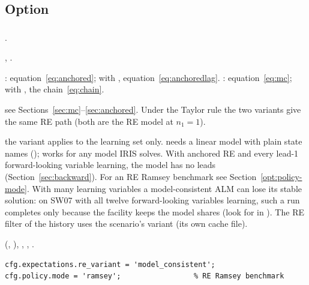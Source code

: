 \documentclass[11pt,a4paper]{article}
\DeclareRobustCommand{\codem}[1]{\texttt{\detokenize{#1}}}
\newenvironment{optspec}%
  {\begin{description}[style=sameline,leftmargin=2.7cm,labelwidth=2.5cm,font=\normalfont\itshape]}%
  {\end{description}}
\begin{document}
\subsection{Option}

\subsubsection{\texorpdfstring{\codem{expectations.re_variant}}{expectations.re\_variant}}\label{opt:expectations-re-variant}
\begin{optspec}
  \item[Default] .
  \item[Values] , .
  \item[Math] : equation~\eqref{eq:anchored}; with
        , equation~\eqref{eq:anchoredlag}. :
        equation~\eqref{eq:mc}; with , the chain~\eqref{eq:chain}.
  \item[Assumptions] see Sections~\ref{sec:mc}--\ref{sec:anchored}. Under the Taylor rule the
        two variants give the same RE path (both are the RE model at $n_1 = 1$).
  \item[Interactions] the variant applies to the learning set only.  needs a
        linear model with plain state names ();
         works for any model IRIS solves. With anchored RE and every
        lead-1 forward-looking variable learning, the model has no leads
        (Section~\ref{sec:backward}). For an RE Ramsey benchmark see
        Section~\ref{opt:policy-mode}. With many
        learning variables a model-consistent ALM can lose its stable solution: on SW07 with
        all twelve forward-looking variables learning, such a run completes only because the
        facility keeps the model shares (look for  in
        ). The RE filter of the history uses the scenario's variant (its own
        cache file).
  \item[Code]  (, ),
        , , .
  \item[Example]
\begin{lstlisting}
cfg.expectations.re_variant = 'model_consistent';
cfg.policy.mode = 'ramsey';                 % RE Ramsey benchmark
\end{lstlisting}
\end{optspec}
\end{document}
